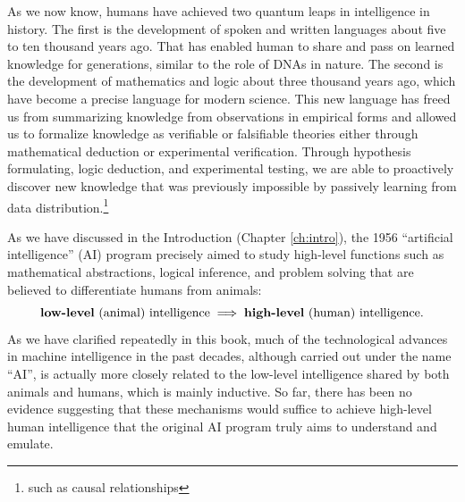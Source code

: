 \documentclass[../../book-main.tex]{subfiles}
\begin{document}




As we now know, humans have achieved two quantum leaps in intelligence in history.
The first is the development of spoken and written languages about five to ten thousand years ago. That has enabled human to share and pass on learned knowledge for generations, similar to the role of DNAs in nature. The second is the development of mathematics and logic about three thousand years ago, which have become a precise language for modern science. This new language has freed us from summarizing knowledge from observations in empirical forms and allowed us to formalize knowledge as verifiable or falsifiable theories either through mathematical deduction or experimental verification. Through hypothesis formulating, logic deduction, and experimental testing, we are able to proactively discover new knowledge that was previously impossible by passively learning from data distribution.\footnote{such as causal relationships}

As we have discussed in the Introduction (Chapter \ref{ch:intro}), the 1956 ``artificial intelligence'' (AI) program precisely aimed to study high-level functions such as mathematical abstractions, logical inference, and problem solving that are believed to differentiate humans from animals: 
\begin{equation}
   \mbox{\textbf{low-level} (animal) intelligence} \; \Longrightarrow \; 
   \mbox{\textbf{high-level} (human) intelligence.}
\end{equation}
As we have clarified repeatedly in this book, much of the technological advances in machine intelligence in the past decades, although carried out under the name ``AI'', is actually more closely related to the low-level intelligence shared by both animals and humans, which is mainly inductive. So far, there has been no evidence suggesting that these mechanisms would suffice to achieve high-level human intelligence that the original AI program truly aims to understand and emulate. 
\end{document}
